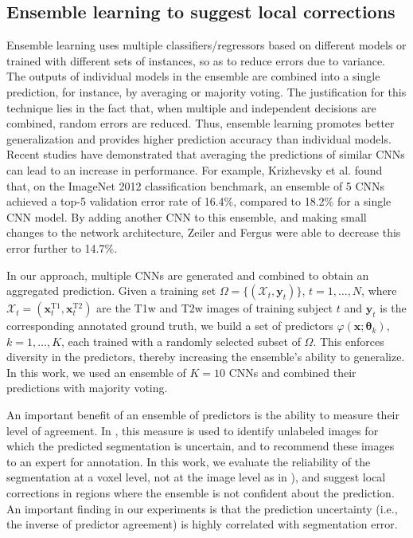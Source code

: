 \documentclass[twoside,espcrc2]{elsarticle}
\newcommand{\mr}[1]{\mathrm{#1}}
\renewcommand{\vec}[1]{\mathbf{#1}}
\newcommand{\xx}{\vec x}
\newcommand{\yy}{\vec y}
\newcommand{\vt}{\boldsymbol{\theta}}
\begin{document}
\subsection{Ensemble learning to suggest local corrections}



Ensemble learning uses multiple classifiers/regressors based on different models or trained with different sets of instances, so as to reduce errors due to variance. The outputs of individual models in the ensemble are combined into a single prediction, for instance, by averaging or majority voting. The justification for this technique lies in the fact that, when multiple and independent decisions are combined, random errors are reduced. 
Thus, ensemble learning promotes better generalization and provides higher prediction accuracy than individual models. Recent studies have demonstrated that averaging the predictions of similar CNNs can lead to an increase in performance. For example, Krizhevsky et al. \cite{krizhevsky2012imagenet} found that, on the ImageNet 2012 classification benchmark, an ensemble of 5 CNNs achieved a top-5 validation error rate of 16.4$\%$, compared to 18.2$\%$ for a single CNN model. By adding another CNN to this ensemble, and making small changes to the network architecture, Zeiler and Fergus \cite{zeiler2014visualizing} were able to decrease this error further to 14.7$\%$.

In our approach, multiple CNNs are generated and combined to obtain an aggregated prediction. Given a training set $\Omega = \{ (\mathcal{X}_t, \yy_t)\}$, $t = 1,\ldots,N$, where $\mathcal{X}_t = (\xx^\mr{T1}_t, \xx^\mr{T2}_t)$ are the T1w and T2w images of training subject $t$ and $\yy_t$ is the corresponding annotated ground truth, we build a set of predictors $\varphi(\xx; \vt_k)$, $k = 1, \ldots, K$, each trained with a randomly selected subset of $\Omega$. This enforces diversity in the predictors, thereby increasing the ensemble's ability to generalize. In this work, we used an ensemble of $K=10$ CNNs and combined their predictions with majority voting. 


An important benefit of an ensemble of predictors is the ability to measure their level of agreement. In \cite{yang2017suggestive}, this measure is used to identify unlabeled images for which the predicted segmentation is uncertain, and to recommend these images to an expert for annotation. In this work, we evaluate the reliability of the segmentation at a voxel level, not at the image level as in \cite{yang2017suggestive}), and suggest local corrections in regions where the ensemble is not confident about the prediction. An important finding in our experiments is that the prediction uncertainty (i.e., the inverse of predictor agreement) is highly correlated with segmentation error.
 
\end{document}
